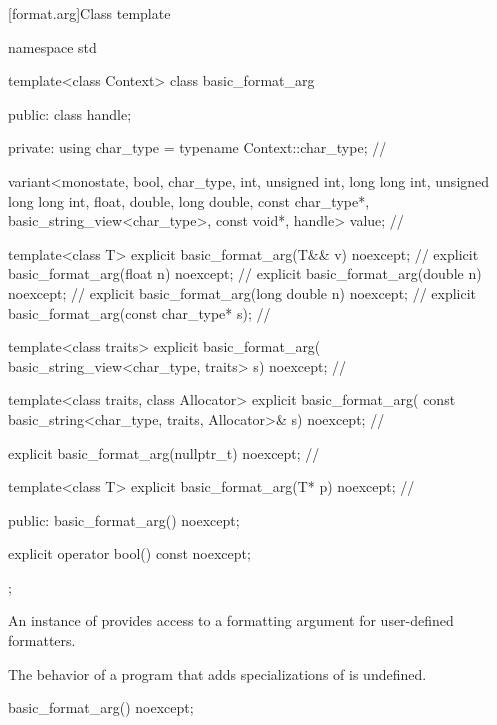 [format.arg]{Class template }

%
\begin{codeblock}
namespace std {
  template<class Context>
  class basic_format_arg {
  public:
    class handle;

  private:
    using char_type = typename Context::char_type;                              // \expos

    variant<monostate, bool, char_type,
            int, unsigned int, long long int, unsigned long long int,
            float, double, long double,
            const char_type*, basic_string_view<char_type>,
            const void*, handle> value;                                         // \expos

    template<class T> explicit basic_format_arg(T&& v) noexcept;                // \expos
    explicit basic_format_arg(float n) noexcept;                                // \expos
    explicit basic_format_arg(double n) noexcept;                               // \expos
    explicit basic_format_arg(long double n) noexcept;                          // \expos
    explicit basic_format_arg(const char_type* s);                              // \expos

    template<class traits>
      explicit basic_format_arg(
        basic_string_view<char_type, traits> s) noexcept;                       // \expos

    template<class traits, class Allocator>
      explicit basic_format_arg(
        const basic_string<char_type, traits, Allocator>& s) noexcept;          // \expos

    explicit basic_format_arg(nullptr_t) noexcept;                              // \expos

    template<class T>
      explicit basic_format_arg(T* p) noexcept;                                 // \expos

  public:
    basic_format_arg() noexcept;

    explicit operator bool() const noexcept;
  };
}
\end{codeblock}

\pnum
An instance of  provides access to
a formatting argument for user-defined formatters.

\pnum
The behavior of a program that adds specializations of
 is undefined.

%
\begin{itemdecl}
basic_format_arg() noexcept;
\end{itemdecl}

